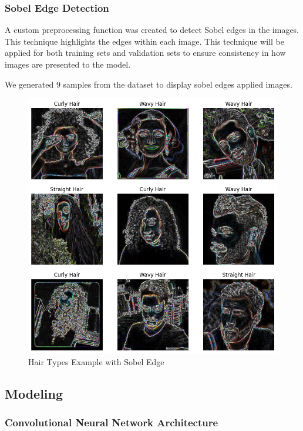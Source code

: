 \subsubsection{Sobel Edge Detection}

A custom preprocessing function was created to detect Sobel edges in the images. This technique highlights the edges within each image. This technique will be applied for both training sets and validation sets to ensure consistency in how images are presented to the model.

We generated 9 samples from the dataset to display sobel edges applied images.

\begin{figure}[H]
  \includegraphics[width=\linewidth]{figures/sobel_edge_images.png}
  \caption{Hair Types Example with Sobel Edge}
  \label{fig:hairtypes}
\end{figure}

\subsection{Modeling}

\subsubsection{Convolutional Neural Network Architecture}

